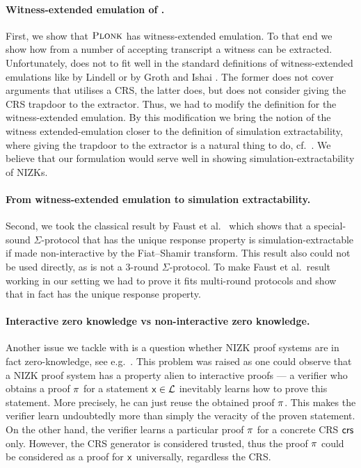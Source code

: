 \documentclass[runningheads,11pt]{llncs}
\theoremstyle{definition}
\begin{document}
\paragraph{Witness-extended emulation of \plonk{}.}
First, we show that $\textsc{Plonk}$ has witness-extended emulation. To that end we show how from a number of accepting transcript a witness can be extracted. Unfortunately, \plonk{} does not to fit well in the standard definitions of witness-extended emulations like by Lindell \cite{JC:Lindell03} or by Groth and Ishai \cite{EC:GroIsh08}. The former does not cover arguments that utilises a CRS, the latter does, but does not consider giving the CRS trapdoor to the extractor. Thus, we had to modify the definition for the witness-extended emulation.
By this modification we bring the notion of the witness extended-emulation closer to the definition of simulation extractability, where giving the trapdoor to the extractor is a natural thing to do, cf.~\cite{AC:Groth06,AC:DHLW10,PKC:ADKNO13,DCC:DerSla19}.
We believe that our formulation would serve well in showing simulation-extractability of NIZKs.

\paragraph{From witness-extended emulation to simulation extractability.}
Second, we took the classical result by Faust et al.~\cite{INDOCRYPT:FKMV12} which shows that a special-sound $\Sigma$-protocol that has the unique response property is simulation-extractable if made non-interactive by the Fiat--Shamir transform. This result also could not be used directly, as \plonk{} is not a $3$-round $\Sigma$-protocol.
To make Faust et al.~result working in our setting we had to prove it fits multi-round protocols and show that \plonk{} in fact has the unique response property.

\paragraph{Interactive zero knowledge vs non-interactive zero knowledge.}
Another issue we tackle with is a question whether NIZK proof systems are in fact zero-knowledge, see e.g.~\cite{C:Pass03}. This problem was raised as one could observe that a NIZK proof system has a property alien to interactive proofs --- a verifier who obtains a proof $\pi$ for a statement $\mathsf{x} \in \mathcal{L}$ inevitably learns how to prove this statement. More precisely, he can just reuse the obtained proof $\pi$. This makes the verifier learn undoubtedly more than simply the veracity of the proven statement. On the other hand, the verifier learns a particular proof $\pi$ for a concrete CRS $\mathsf{crs}$ only. However, the CRS generator is considered trusted, thus the proof $\pi$ could be considered as a proof for $\mathsf{x}$ universally, regardless the CRS.
\end{document}
